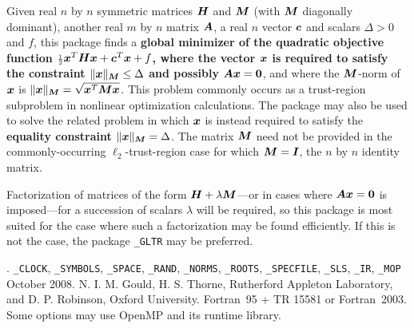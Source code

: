 \documentclass{galahad}
\newcommand{\packagename}{TRS}
\newcommand{\fullpackagename}{\libraryname\_\packagename}
\begin{document}
\galheader


\galsummary
Given real $n$ by $n$ symmetric matrices ${\bm{H}}$ and ${\bm{M}}$
(with ${\bm{M}}$ diagonally dominant), another real $m$ by $n$ matrix ${\bm{A}}$,
a real $n$ vector ${\bm{c}}$ and scalars $\Delta>0$ and $f$, this package finds a
{\bf global minimizer of the quadratic objective function
${\scriptstyle \frac{1}{2}} {\bm{x}}^T {\bm{H}} {\bm{x}}  +  {\bm{c}}^T {\bm{x}} + f$, where the vector ${\bm{x}}$ is
required to satisfy the constraint $\|{\bm{x}}\|_{{\bm{M}}} \leq  \Delta$
and possibly ${\bm{A}} {\bm{x}} = {\bm{0}}$}, and
where the ${\bm{M}}$-norm of ${\bm{x}}$ is $\|{\bm{x}}\|_{{\bm{M}}} = \sqrt{{\bm{x}}^T {\bm{M}} {\bm{x}}}$.
This problem commonly occurs as a trust-region subproblem in nonlinear
optimization calculations.
The package may also be used to solve the related problem in which ${\bm{x}}$ is
instead required to satisfy the
{\bf equality constraint $\|{\bm{x}}\|_{{\bm{M}}} = \Delta$}.
The matrix ${\bm{M}}$ need not be provided in the commonly-occurring
$\ell_2$-trust-region case for which ${\bm{M}} = {\bm{I}}$, the $n$ by $n$
identity matrix.

\noindent
Factorization of matrices of the form ${\bm{H}} + \lambda {\bm{M}}$---or
in cases where ${\bm{A}} {\bm{x}} = {\bm{0}}$ is imposed---for a succession
of scalars $\lambda$ will be required, so this package is most suited
for the case where such a factorization may be found efficiently. If
this is not the case, the package {\tt \libraryname\_GLTR} may be preferred.


\galattributes
\galversions{\tt  \fullpackagename\_single, \fullpackagename\_double}.
\galuses
{\tt \libraryname\_CLOCK},
{\tt \libraryname\_SY\-M\-BOLS},
{\tt \libraryname\_SPACE}, {\tt \libraryname\_\-RAND},
{\tt \libraryname\_\-NORMS},
{\tt \libraryname\_ROOTS}, {\tt \libraryname\_SPECFILE},
{\tt \libraryname\_SLS}, {\tt \libraryname\_IR},
{\tt \libraryname\_MOP}
\galdate October 2008.
\galorigin N. I. M. Gould, H. S. Thorne, Rutherford Appleton Laboratory,
and D. P. Robinson, Oxford University.
\gallanguage Fortran~95 + TR 15581 or Fortran~2003.
\galparallelism Some options may use OpenMP and its runtime library.


\galhowto


\end{document}
